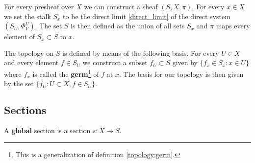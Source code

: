 	\begin{construct}\label{sheaf:associated_construction}
		For every presheaf over $X$ we can construct a sheaf $(S, X, \pi)$. For every $x\in X$ we set the stalk $S_x$ to be the direct limit \ref{direct_limit} of the direct system $(S_U, \Phi^U_V)$. The set $S$ is then defined as the union of all sets $S_x$ and $\pi$ maps every element of $S_x\subset S$ to $x$.
		
		The topology on $S$ is defined by means of the following basis. For every $U\in X$ and every element $f\in S_U$ we construct a subset $f_U\subset S$ given by $\{f_x\in S_x:x\in U\}$ where $f_x$ is called the \textbf{germ}\footnote{This is a generalization of definition \ref{topology:germ}.} of $f$ at $x$. The basis for our topology is then given by the set $\{f_U:U\subset X, f\in S_U\}$.
	\end{construct}
	
\subsection{Sections}{
	\begin{remark*}
		A \textbf{global} section is a section $s:X\rightarrow S$.
	\end{remark*}
}
